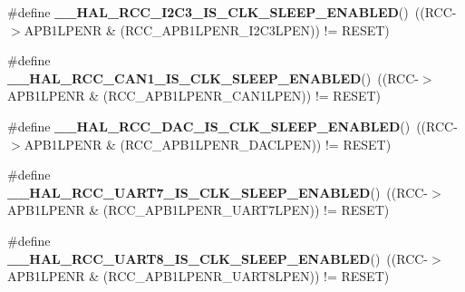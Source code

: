 \begin{DoxyCompactItemize}
\item 
\mbox{\label{group___r_c_c___clock___sleep___enable___disable___status_gaae09cbe8d45bdf89178a4adfed223f4b}} 
\#define {\bfseries \+\_\+\+\_\+\+H\+A\+L\+\_\+\+R\+C\+C\+\_\+\+I2\+C3\+\_\+\+I\+S\+\_\+\+C\+L\+K\+\_\+\+S\+L\+E\+E\+P\+\_\+\+E\+N\+A\+B\+L\+ED}()~((R\+CC-\/$>$A\+P\+B1\+L\+P\+E\+NR \& (R\+C\+C\+\_\+\+A\+P\+B1\+L\+P\+E\+N\+R\+\_\+\+I2\+C3\+L\+P\+EN)) != R\+E\+S\+ET)
\item 
\mbox{\label{group___r_c_c___clock___sleep___enable___disable___status_ga505f485ab0cbc82525211be50fc4b9af}} 
\#define {\bfseries \+\_\+\+\_\+\+H\+A\+L\+\_\+\+R\+C\+C\+\_\+\+C\+A\+N1\+\_\+\+I\+S\+\_\+\+C\+L\+K\+\_\+\+S\+L\+E\+E\+P\+\_\+\+E\+N\+A\+B\+L\+ED}()~((R\+CC-\/$>$A\+P\+B1\+L\+P\+E\+NR \& (R\+C\+C\+\_\+\+A\+P\+B1\+L\+P\+E\+N\+R\+\_\+\+C\+A\+N1\+L\+P\+EN)) != R\+E\+S\+ET)
\item 
\mbox{\label{group___r_c_c___clock___sleep___enable___disable___status_gad97aab0cffdef7edd52e48e0e5bef9dc}} 
\#define {\bfseries \+\_\+\+\_\+\+H\+A\+L\+\_\+\+R\+C\+C\+\_\+\+D\+A\+C\+\_\+\+I\+S\+\_\+\+C\+L\+K\+\_\+\+S\+L\+E\+E\+P\+\_\+\+E\+N\+A\+B\+L\+ED}()~((R\+CC-\/$>$A\+P\+B1\+L\+P\+E\+NR \& (R\+C\+C\+\_\+\+A\+P\+B1\+L\+P\+E\+N\+R\+\_\+\+D\+A\+C\+L\+P\+EN)) != R\+E\+S\+ET)
\item 
\mbox{\label{group___r_c_c___clock___sleep___enable___disable___status_ga50fe316bea792eb1ae49c13445496193}} 
\#define {\bfseries \+\_\+\+\_\+\+H\+A\+L\+\_\+\+R\+C\+C\+\_\+\+U\+A\+R\+T7\+\_\+\+I\+S\+\_\+\+C\+L\+K\+\_\+\+S\+L\+E\+E\+P\+\_\+\+E\+N\+A\+B\+L\+ED}()~((R\+CC-\/$>$A\+P\+B1\+L\+P\+E\+NR \& (R\+C\+C\+\_\+\+A\+P\+B1\+L\+P\+E\+N\+R\+\_\+\+U\+A\+R\+T7\+L\+P\+EN)) != R\+E\+S\+ET)
\item 
\mbox{\label{group___r_c_c___clock___sleep___enable___disable___status_ga2ae6d306df3dcdc37c26446506f948c2}} 
\#define {\bfseries \+\_\+\+\_\+\+H\+A\+L\+\_\+\+R\+C\+C\+\_\+\+U\+A\+R\+T8\+\_\+\+I\+S\+\_\+\+C\+L\+K\+\_\+\+S\+L\+E\+E\+P\+\_\+\+E\+N\+A\+B\+L\+ED}()~((R\+CC-\/$>$A\+P\+B1\+L\+P\+E\+NR \& (R\+C\+C\+\_\+\+A\+P\+B1\+L\+P\+E\+N\+R\+\_\+\+U\+A\+R\+T8\+L\+P\+EN)) != R\+E\+S\+ET)

\end{DoxyCompactItemize}
